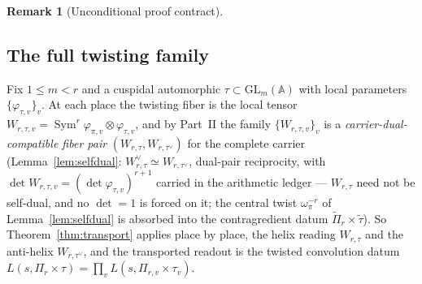 \documentclass[11pt]{article}
\theoremstyle{definition}
\newtheorem{remark}[theorem]{Remark}
\newcommand{\Sym}{\operatorname{Sym}}
\begin{document}
\begin{remark}[Unconditional proof contract]
\begin{enumerate}
\section{The full twisting family}\label{sec:cps-twist}
Fix $1\le m<r$ and a cuspidal automorphic $\tau\subset\mathrm{GL}_m(\mathbb A)$ with local parameters
$\{\varphi_{\tau,v}\}_v$. At each place the twisting fiber is the local tensor
$W_{r,\tau,v}=\Sym^r\varphi_{\pi,v}\otimes\varphi_{\tau,v}$, and by Part~II the family
$\{W_{r,\tau,v}\}_v$ is a \emph{carrier-dual-compatible fiber pair} $(W_{r,\tau},W_{r,\tau^\vee})$ for the
complete carrier (Lemma~\ref{lem:selfdual}: $W_{r,\tau}^\vee\simeq W_{r,\tau^\vee}$, dual-pair reciprocity, with
$\det W_{r,\tau,v}=(\det\varphi_{\tau,v})^{r+1}$ carried in the arithmetic ledger --- $W_{r,\tau}$ need not be self-dual, and no $\det=1$ is forced on it; the central twist $\omega_\pi^{-r}$ of Lemma~\ref{lem:selfdual} is absorbed into the contragredient datum $\widetilde\Pi_r\times\widetilde\tau$). So Theorem~\ref{thm:transport} applies place by place, the helix
reading $W_{r,\tau}$ and the anti-helix $W_{r,\tau^\vee}$, and the transported readout is the twisted
convolution datum $L(s,\Pi_r\times\tau)=\prod_v L(s,\Pi_{r,v}\times\tau_v)$.


\end{enumerate}
\end{remark}
\end{document}
